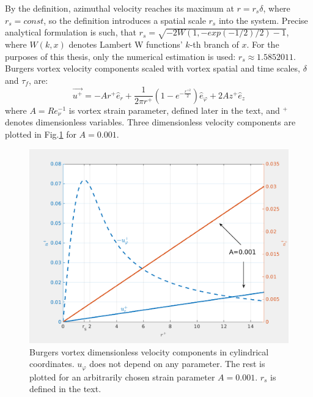 \documentclass[../main.tex]{subfiles}
\begin{document}
By the definition, azimuthal velocity reaches its maximum at $r=r_s \delta$, where $r_s=const$, so the definition introduces a spatial scale $r_s$ into the system. Precise analytical formulation is such, that $r_s=\sqrt{-2 W(1,-exp(-1/2)/2)-1}$, where $W(k,x)$ denotes Lambert W functions' $k$-th branch of $x$. For the purposes of this thesis, only the numerical estimation is used: $r_s \approx 1.5852011$. Burgers vortex velocity components scaled with vortex spatial and time scales, $\delta$ and $\tau_f$, are:
\begin{equation}
\vec{u^+}=- A r^+ \hat{e}_r+\frac{1}{2 \pi r^+} \left(1-e^{-\frac{r^{+ 2}}{2}}\right)\hat{e}_{\varphi}+ 2 A z^+ \hat{e}_z
\label{def:Bur_nodim}
\end{equation}
where $A=Re_{\nu}^{-1}$ is vortex strain parameter, defined later in the text, and $^+$ denotes dimensionless variables. Three dimensionless velocity components are plotted in Fig.\ref{fig:ch2_01b} for $A=0.001$.
\begin{figure}
\centering
\noindent \includegraphics[width=30pc]{gfx/Burg_vor_vel_comp.png}
\caption{Burgers vortex dimensionless velocity components in cylindrical coordinates. $u_{\varphi}$ does not depend on any parameter. The rest is plotted for an arbitrarily chosen strain parameter $A=0.001$. $r_s$ is defined in the text.}
\label{fig:ch2_01b}
\end{figure}
\end{document}

